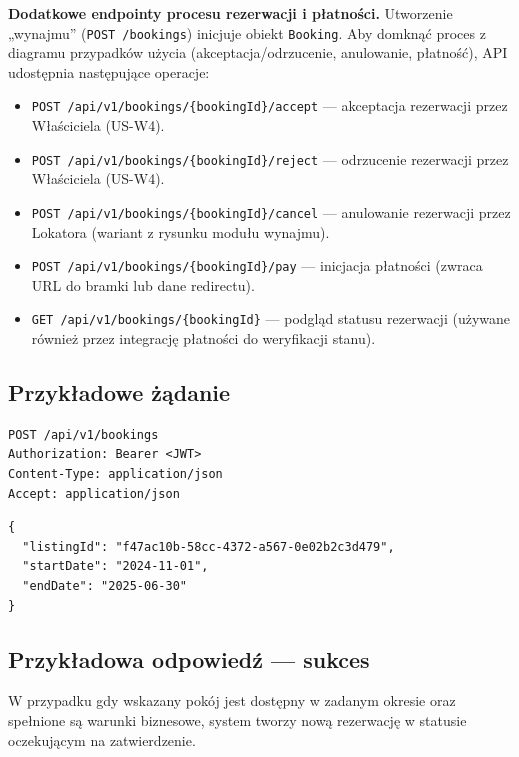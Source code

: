 \documentclass[11pt, a4paper]{article}
\begin{document}
\noindent\textbf{Dodatkowe endpointy procesu rezerwacji i płatności.} Utworzenie „wynajmu” (\texttt{POST /bookings}) inicjuje obiekt \texttt{Booking}.
Aby domknąć proces z diagramu przypadków użycia (akceptacja/odrzucenie, anulowanie, płatność), API udostępnia następujące operacje:
\begin{itemize}
    \item \texttt{POST /api/v1/bookings/\{bookingId\}/accept} --- akceptacja rezerwacji przez Właściciela (US-W4).
    \item \texttt{POST /api/v1/bookings/\{bookingId\}/reject} --- odrzucenie rezerwacji przez Właściciela (US-W4).
    \item \texttt{POST /api/v1/bookings/\{bookingId\}/cancel} --- anulowanie rezerwacji przez Lokatora (wariant z rysunku modułu wynajmu).
    \item \texttt{POST /api/v1/bookings/\{bookingId\}/pay} --- inicjacja płatności (zwraca URL do bramki lub dane redirectu).
    \item \texttt{GET /api/v1/bookings/\{bookingId\}} --- podgląd statusu rezerwacji (używane również przez integrację płatności do weryfikacji stanu).
\end{itemize}


\subsection{Przykładowe żądanie}

\begin{lstlisting}[style=http,caption={Żądanie HTTP — wynajem pokoju}]
POST /api/v1/bookings
Authorization: Bearer <JWT>
Content-Type: application/json
Accept: application/json
\end{lstlisting}

\begin{lstlisting}[style=json,caption={Ciało żądania — wynajem pokoju}]
{
  "listingId": "f47ac10b-58cc-4372-a567-0e02b2c3d479",
  "startDate": "2024-11-01",
  "endDate": "2025-06-30"
}
\end{lstlisting}

\subsection{Przykładowa odpowiedź — sukces}

W przypadku gdy wskazany pokój jest dostępny w zadanym okresie oraz spełnione
są warunki biznesowe, system tworzy nową rezerwację w statusie oczekującym na
zatwierdzenie.
\end{document}

